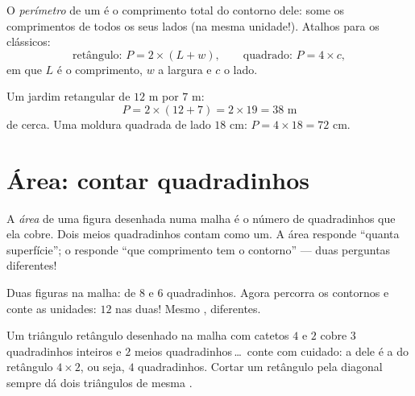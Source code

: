 \begin{definition}[Perímetro]\label{def:g4:measure:perimeter}
O \emph{perímetro} de um  é o comprimento
total do contorno dele: some os comprimentos de todos os seus lados
(na mesma unidade!). Atalhos para os clássicos:
\[
\text{retângulo: } P = 2 \times (L + w),
\qquad
\text{quadrado: } P = 4 \times c ,
\]
em que $L$ é o comprimento, $w$ a largura e $c$ o lado.
\end{definition}

\begin{example}\label{ex:g4:measure:perimeter}
Um jardim retangular de $12$ m por $7$ m:
\[
P = 2 \times (12 + 7) = 2 \times 19 = 38 \text{ m}
\]
de cerca. Uma moldura quadrada de lado $18$ cm:
$P = 4 \times 18 = 72$ cm.
\end{example}

\section{Área: contar quadradinhos}

\begin{definition}\label{def:g4:measure:area}
A \emph{área} de uma figura desenhada numa malha é o
número de quadradinhos que ela cobre. Dois meios quadradinhos contam
como um. A área responde ``quanta superfície''; o  responde
``que comprimento tem o contorno'' --- duas perguntas diferentes!
\end{definition}

\begin{omfigure}

{\small Duas figuras na malha:  de $8$ e $6$ quadradinhos. Agora
percorra os contornos e conte as unidades: $12$ nas duas! Mesmo
,  diferentes.}
\end{omfigure}

\begin{example}\label{ex:g4:measure:half}
Um triângulo retângulo desenhado na malha com catetos $4$ e $2$ cobre
$3$ quadradinhos inteiros e $2$ meios quadradinhos\,\dots\ conte com
cuidado: a  dele é a  do retângulo $4 \times 2$, ou seja,
$4$ quadradinhos. Cortar um retângulo pela diagonal sempre dá dois
triângulos de mesma .
\end{example}

